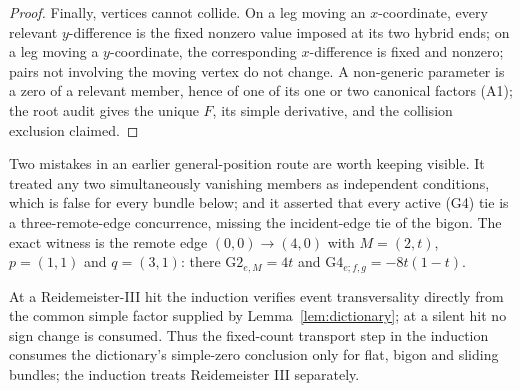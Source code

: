 \begin{proof}
Finally, vertices cannot collide. On a leg moving an $x$-coordinate, every
relevant $y$-difference is the fixed nonzero value imposed at its two hybrid
ends; on a leg moving a $y$-coordinate, the corresponding $x$-difference is
fixed and nonzero; pairs not involving the moving vertex do not change. A
non-generic parameter is a zero of a relevant member, hence of one of its one
or two canonical factors (A1); the root audit gives
the unique $F$, its simple derivative, and the collision exclusion claimed.
\end{proof}

\begin{remark}\label{rem:bundles}
Two mistakes in an earlier general-position route are worth keeping visible.
It treated any two simultaneously vanishing members as independent conditions,
which is false for every bundle below; and it asserted that every active (G4)
tie is a three-remote-edge concurrence, missing the incident-edge tie of the
bigon. The exact witness is the remote edge $(0,0)\to(4,0)$ with
$M=(2,t)$, $p=(1,1)$ and $q=(3,1)$: there
$\mathrm{G2}_{e,M}=4t$ and $\mathrm{G4}_{e;f,g}=-8t(1-t)$.
\end{remark}

\begin{remark}\label{rem:bundlescope}
At a Reidemeister-III hit the induction verifies event transversality directly
from the common simple factor supplied by Lemma~\ref{lem:dictionary}; at a
silent hit no sign change is consumed. Thus the fixed-count transport step in the induction
consumes the dictionary's simple-zero conclusion only for flat, bigon and
sliding bundles; the induction treats Reidemeister III separately.
\end{remark}

